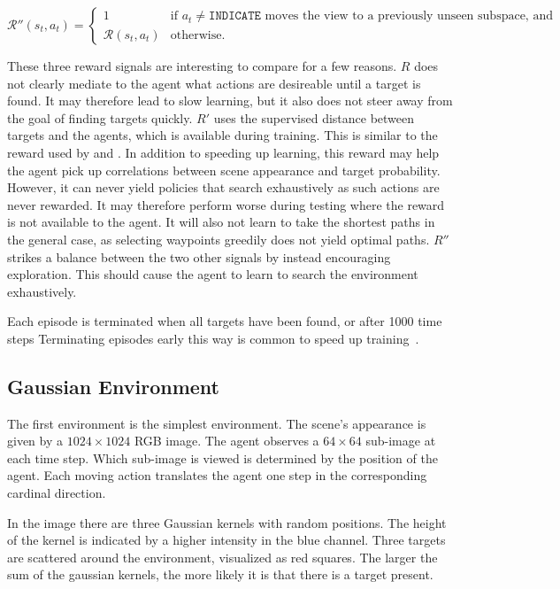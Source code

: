 \begin{equation*}
    \mathcal{R}''(s_t, a_t) =
    \begin{cases}
        1 & \text{if \(a_t \neq \mathtt{INDICATE}\) moves the view to a previously unseen subspace, and} \\
        \mathcal{R}(s_t, a_t) & \text{otherwise}.
    \end{cases}
\end{equation*}

These three reward signals are interesting to compare for a few reasons.
\(R\) does not clearly mediate to the agent what actions are desireable until a target is found.
It may therefore lead to slow learning, but it also does not steer away from the goal of finding targets quickly.
\(R'\) uses the supervised distance between targets and the agents, which is available during training.
This is similar to the reward used by \cite{caicedo_active_2015} and \cite{ghesu_artificial_2016}.
In addition to speeding up learning, this reward may help the agent pick up correlations between scene appearance and target probability.
However, it can never yield policies that search exhaustively as such actions are never rewarded.
It may therefore perform worse during testing where the reward is not available to the agent.
It will also not learn to take the shortest paths in the general case, as selecting waypoints greedily does not yield optimal paths.
\(R''\) strikes a balance between the two other signals by instead encouraging exploration.
This should cause the agent to learn to search the environment exhaustively.

Each episode is terminated when all targets have been found, or after 1000 time steps
Terminating episodes early this way is common to speed up training~\cite{pardo_timelimits_2022}.

\subsection{Gaussian Environment}

The first environment is the simplest environment. 
The scene's appearance is given by a \(1024 \times 1024\) RGB image.
The agent observes a \(64 \times 64\) sub-image at each time step.
Which sub-image is viewed is determined by the position of the agent.
Each moving action translates the agent one step in the corresponding cardinal direction.

In the image there are three Gaussian kernels with random positions.
The height of the kernel is indicated by a higher intensity in the blue channel.
Three targets are scattered around the environment, visualized as red squares.
The larger the sum of the gaussian kernels, the more likely it is that there is a target present.

